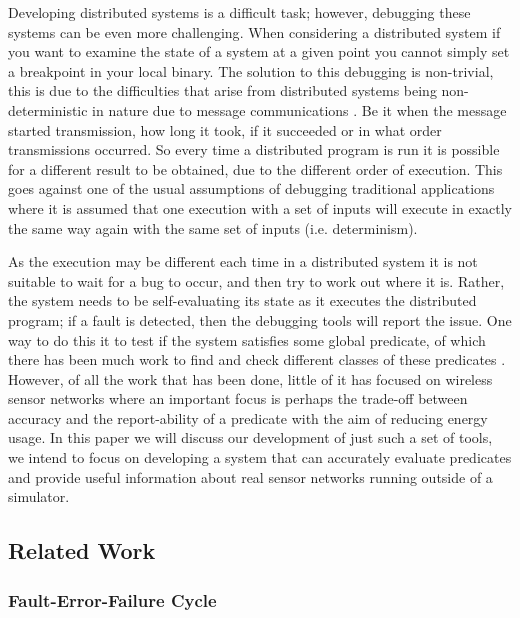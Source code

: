 Developing distributed systems is a difficult task; however, debugging these systems can be even more challenging\cite{345131}. When considering a distributed system if you want to examine the state of a system at a given point you cannot simply set a breakpoint in your local binary. The solution to this debugging is non-trivial, this is due to the difficulties that arise from distributed systems being non-deterministic in nature due to message communications \cite{1676929,Joyce:1987:MDS:13677.22723,Fagerstrom:1988:DTD:55823.55833}. Be it when the message started transmission, how long it took, if it succeeded or in what order transmissions occurred. So every time a distributed program is run it is possible for a different result to be obtained, due to the different order of execution. This goes against one of the usual assumptions of debugging traditional applications where it is assumed that one execution with a set of inputs will execute in exactly the same way again with the same set of inputs \cite{?} (i.e. determinism).

As the execution may be different each time in a distributed system it is not suitable to wait for a bug to occur, and then try to work out where it is. Rather, the system needs to be self-evaluating its state as it executes the distributed program; if a fault is detected, then the debugging tools will report the issue. One way to do this it to test if the system satisfies some global predicate, of which there has been much work to find and check different classes of these predicates \cite{553309,345831,277788}. However, of all the work that has been done, little of it has focused on wireless sensor networks where an important focus is perhaps the trade-off between accuracy and the report-ability of a predicate with the aim of reducing energy usage. In this paper we will discuss our development of just such a set of tools, we intend to focus on developing a system that can accurately evaluate predicates and provide useful information about real sensor networks running outside of a simulator.

\subsection{Related Work}

\subsubsection{Fault-Error-Failure Cycle}

